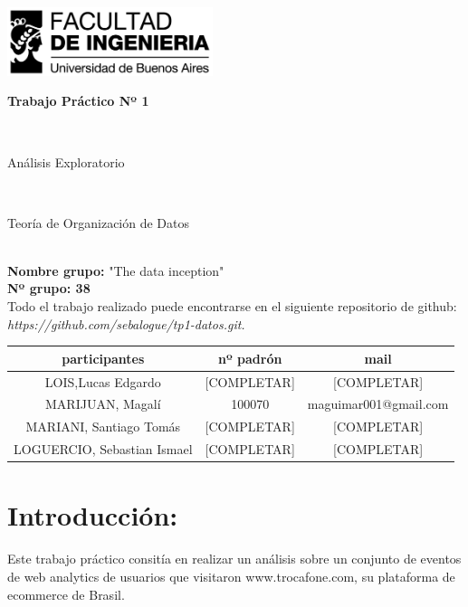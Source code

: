 \documentclass[titlepage,a4paper]{article}
\begin{document}
	\begin{titlepage}
		\hfill\includegraphics[width=6cm]{logofiuba.jpg}
		\center
		\vfill
		\vfill
		\begin{center}
			\begin{Huge}\textbf{Trabajo Práctico Nº 1}\end{Huge}\\
			\vfill
			\begin{huge}Análisis Exploratorio\end{huge}\\
			\vfill
			\begin{Large} Teoría de Organización de Datos\end{Large}\\

			\textbf{Nombre grupo:} "The data inception" \\
			\textbf{Nº grupo: 38}\\
				Todo el trabajo realizado puede encontrarse en el siguiente repositorio de github:\textit{ https://github.com/sebalogue/tp1-datos.git. }
	
			\vfill
			\begin{tabular}{|c|c|c|}
				\hline
				participantes & nº padrón & mail \\ \hline
				LOIS,Lucas Edgardo &[COMPLETAR] &  [COMPLETAR] \\ \hline
				MARIJUAN, Magalí & 100070 & maguimar001@gmail.com\\ \hline
				MARIANI, Santiago Tomás &[COMPLETAR] &  [COMPLETAR] \\ \hline
				LOGUERCIO, Sebastian Ismael &[COMPLETAR] &  [COMPLETAR] \\ \hline
			\end{tabular}
			\vfill
			\vfill
			\vfill
			\vfill
			\vfill
			\vfill
		\end{center}
	
	\end{titlepage}

	\tableofcontents
	\newpage
	
	\section{Introducción:}
	Este trabajo práctico consitía en realizar un análisis sobre un conjunto de eventos de web analytics de usuarios que visitaron www.trocafone.com, su plataforma de ecommerce de Brasil.
	
\end{document}
